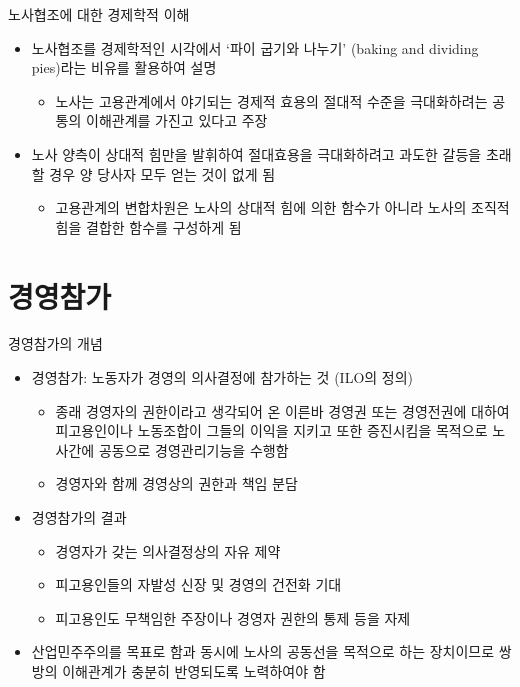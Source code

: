 \documentclass[aspectratio=169,xcolor=dvipsnames,handout]{beamer}
\begin{document}
\begin{frame}{노사협조에 대한 경제학적 이해}
    \begin{itemize}[<+->]
        \item 노사협조를 경제학적인 시각에서 `파이 굽기와 나누기' (baking and dividing pies)라는 비유를 활용하여 설명
        \begin{itemize}[<+->]
            \item 노사는 고용관계에서 야기되는 경제적 효용의 절대적 수준을 극대화하려는 공통의 이해관계를 가진고 있다고 주장
        \end{itemize}
        \item 노사 양측이 상대적 힘만을 발휘하여 절대효용을 극대화하려고 과도한 갈등을 초래할 경우 양 당사자 모두 얻는 것이 없게 됨 
        \begin{itemize}[<+->]
            \item 고용관계의 변합차원은 노사의 상대적 힘에 의한 함수가 아니라 노사의 조직적 힘을 결합한 함수를 구성하게 됨
        \end{itemize}
    \end{itemize}
\end{frame}
    
\section{경영참가}

\begin{frame}[allowframebreaks]{경영참가의 개념}
    \begin{itemize}[<+->]
        \item 경영참가: 노동자가 경영의 의사결정에 참가하는 것 (ILO의 정의)
        \begin{itemize}[<+->]
            \item 종래 경영자의 권한이라고 생각되어 온 이른바 경영권 또는 경영전권에 대하여 피고용인이나 노동조합이 그들의 이익을 지키고 또한 증진시킴을 목적으로 노사간에 공동으로 경영관리기능을 수행함
            \item 경영자와 함께 경영상의 권한과 책임 분담
        \end{itemize}
        \framebreak\relax
        \item 경영참가의 결과
        \begin{itemize}[<+->]
            \item 경영자가 갖는 의사결정상의 자유 제약
            \item 피고용인들의 자발성 신장 및 경영의 건전화 기대
            \item 피고용인도 무책임한 주장이나 경영자 권한의 통제 등을 자제
        \end{itemize}
        \item 산업민주주의를 목표로 함과 동시에 노사의 공동선을 목적으로 하는 장치이므로 쌍방의 이해관계가 충분히 반영되도록 노력하여야 함
    \end{itemize}
\end{frame}
\end{document}
